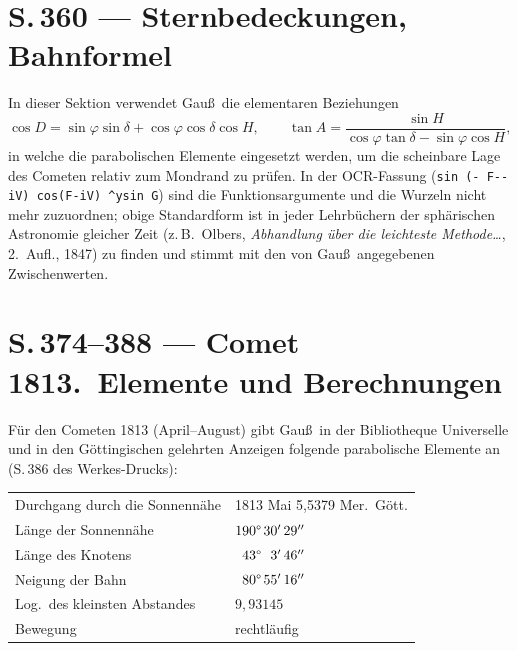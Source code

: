 \documentclass[11pt,a4paper]{article}
\newcommand{\arcmin}{^{\prime}}
\newcommand{\arcsec}{^{\prime\prime}}
\begin{document}
\section*{S.\,360 --- Sternbedeckungen, Bahnformel}

In dieser Sektion verwendet Gau\ss\ die elementaren Beziehungen
\[
\cos D = \sin\varphi\sin\delta + \cos\varphi\cos\delta\cos H,\qquad
\tan A = \frac{\sin H}{\cos\varphi\tan\delta - \sin\varphi\cos H},
\]
in welche die parabolischen Elemente eingesetzt werden, um die scheinbare Lage
des Cometen relativ zum Mondrand zu pr\"ufen. In der OCR-Fassung
(\verb|sin (- F-- iV) cos(F-iV) ^ysin G|) sind die Funktionsargumente und die
Wurzeln nicht mehr zuzuordnen; obige Standardform ist in jeder Lehrb\"uchern
der sph\"arischen Astronomie gleicher Zeit (z.\,B.\ Olbers, \textit{Abhandlung
\"uber die leichteste Methode\ldots}, 2.~Aufl., 1847) zu finden und stimmt
mit den von Gau\ss\ angegebenen Zwischenwerten.

\section*{S.\,374--388 --- Comet 1813.\ Elemente und Berechnungen}

\noindent
F\"ur den Cometen 1813 (April--August) gibt Gau\ss\ in der Bibliotheque Universelle
und in den G\"ottingischen gelehrten Anzeigen folgende parabolische Elemente an
(S.\,386 des Werkes-Drucks):

\begin{center}
\begin{tabular}{l l}
\toprule
Durchgang durch die Sonnenn\"ahe & 1813 Mai \phantom{0}5,5379 Mer.\ G\"ott.\\
L\"ange der Sonnenn\"ahe          & $190\degree\,30\arcmin\,29\arcsec$\\
L\"ange des Knotens               & $\phantom{0}43\degree\,\phantom{0}3\arcmin\,46\arcsec$\\
Neigung der Bahn                 & $\phantom{0}80\degree\,55\arcmin\,16\arcsec$\\
Log.\ des kleinsten Abstandes    & $9{,}93145$\\
Bewegung                         & rechtl\"aufig\\
\bottomrule
\end{tabular}
\end{center}
\end{document}
